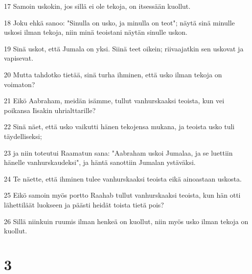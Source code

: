 \par 17 Samoin uskokin, jos sillä ei ole tekoja, on itsessään kuollut.
\par 18 Joku ehkä sanoo: "Sinulla on usko, ja minulla on teot"; näytä sinä minulle uskosi ilman tekoja, niin minä teoistani näytän sinulle uskon.
\par 19 Sinä uskot, että Jumala on yksi. Siinä teet oikein; riivaajatkin sen uskovat ja vapisevat.
\par 20 Mutta tahdotko tietää, sinä turha ihminen, että usko ilman tekoja on voimaton?
\par 21 Eikö Aabraham, meidän isämme, tullut vanhurskaaksi teoista, kun vei poikansa Iisakin uhrialttarille?
\par 22 Sinä näet, että usko vaikutti hänen tekojensa mukana, ja teoista usko tuli täydelliseksi;
\par 23 ja niin toteutui Raamatun sana: "Aabraham uskoi Jumalaa, ja se luettiin hänelle vanhurskaudeksi", ja häntä sanottiin Jumalan ystäväksi.
\par 24 Te näette, että ihminen tulee vanhurskaaksi teoista eikä ainoastaan uskosta.
\par 25 Eikö samoin myös portto Raahab tullut vanhurskaaksi teoista, kun hän otti lähettiläät luokseen ja päästi heidät toista tietä pois?
\par 26 Sillä niinkuin ruumis ilman henkeä on kuollut, niin myös usko ilman tekoja on kuollut.

\chapter{3}

